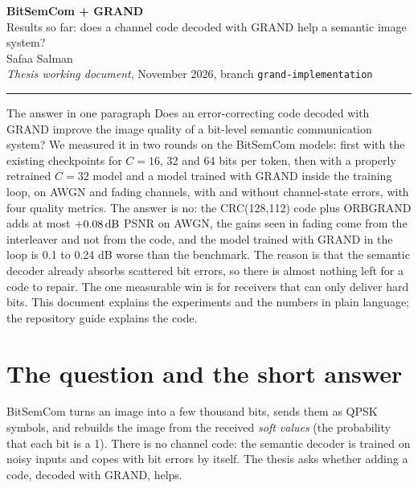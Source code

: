 \documentclass{article}
\begin{document}
\begin{center}
{\LARGE \bfseries \color{deepred} BitSemCom + GRAND}\\[2pt]
{\large \color{deepred} Results so far: does a channel code decoded with GRAND help a semantic image system?}\\[6pt]
{\normalsize Safaa Salman}\\[2pt]
{\small \emph{Thesis working document}, November 2026, branch \texttt{grand-implementation}}
\end{center}

\vspace{4pt}
\hrule
\vspace{8pt}

\begin{findingbox}{The answer in one paragraph}
Does an error-correcting code decoded with GRAND improve the image quality of a bit-level semantic
communication system? We measured it in two rounds on the BitSemCom models: first with the existing
checkpoints for $C=16$, 32 and 64 bits per token, then with a properly retrained $C=32$ model and a
model trained with GRAND inside the training loop, on AWGN and fading channels, with and without
channel-state errors, with four quality metrics. The answer is no: the CRC(128,112) code plus ORBGRAND
adds at most $+0.08\,\mathrm{dB}$ PSNR on AWGN, the gains seen in fading come from the interleaver and not from
the code, and the model trained with GRAND in the loop is 0.1 to 0.24 dB worse than the benchmark. The
reason is that the semantic decoder already absorbs scattered bit errors, so there is almost nothing
left for a code to repair. The one measurable win is for receivers that can only deliver hard bits. This
document explains the experiments and the numbers in plain language; the repository guide explains the
code.
\end{findingbox}

\tableofcontents

\section{The question and the short answer}

BitSemCom turns an image into a few thousand bits, sends them as QPSK symbols, and rebuilds the image
from the received \emph{soft values} (the probability that each bit is a 1). There is no channel code:
the semantic decoder is trained on noisy inputs and copes with bit errors by itself. The thesis asks
whether adding a code, decoded with GRAND, helps.
\end{document}
